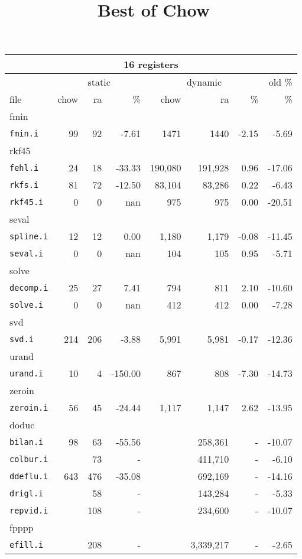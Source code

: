 \documentclass[11pt]{article}
\title{Best of Chow}
\begin{document}
\begin{tabular}{|l|r|r|r|r|r|r|r|}
\hline
\multicolumn{8}{|c|}{16 registers}\\
\hline
&\multicolumn{3}{c}{static}&\multicolumn{3}{|c|}{dynamic}&old \%\\
\hline
file&chow&ra&\%&chow&ra&\%&\%\\
\hline


%
%
\multicolumn{8}{|l|}{fmin}\\
\hline
\texttt{fmin.i}&99&92&-7.61&1471&1440&-2.15&-5.69 \\
\hline
%
%
\multicolumn{8}{|l|}{rkf45}\\
\hline
\texttt{fehl.i}&24&18&-33.33&190,080&191,928&0.96&-17.06 \\
\hline
\texttt{rkfs.i}&81&72&-12.50&83,104&83,286&0.22&-6.43 \\
\hline
\texttt{rkf45.i}&0&0&nan&975&975&0.00&-20.51 \\
\hline
%
%
\multicolumn{8}{|l|}{seval}\\
\hline
\texttt{spline.i}&12&12&0.00&1,180&1,179&-0.08&-11.45 \\
\hline
\texttt{seval.i}&0&0&nan&104&105&0.95&-5.71 \\
\hline
%
%
\multicolumn{8}{|l|}{solve}\\
\hline
\texttt{decomp.i}&25&27&7.41&794&811&2.10&-10.60 \\
\hline
\texttt{solve.i}&0&0&nan&412&412&0.00&-7.28 \\
\hline
%
%
\multicolumn{8}{|l|}{svd}\\
\hline
\texttt{svd.i}&214&206&-3.88&5,991&5,981&-0.17&-12.36 \\
\hline
%
%
\multicolumn{8}{|l|}{urand}\\
\hline
\texttt{urand.i}&10&4&-150.00&867&808&-7.30&-14.73 \\
\hline
%
%
\multicolumn{8}{|l|}{zeroin}\\
\hline
\texttt{zeroin.i}&56&45&-24.44&1,117&1,147&2.62&-13.95 \\
\hline
%
%
\multicolumn{8}{|l|}{doduc}\\
\hline
\texttt{bilan.i}&98&63&-55.56&&258,361&-&-10.07 \\
\hline
\texttt{colbur.i}&&73&-&&411,710&-&-6.10 \\
\hline
\texttt{ddeflu.i}&643&476&-35.08&&692,169&-&-14.16 \\
\hline
\texttt{drigl.i}&&58&-&&143,284&-&-5.33 \\
\hline
\texttt{repvid.i}&&108&-&&234,600&-&-10.07 \\
\hline
%
%
\multicolumn{8}{|l|}{fpppp}\\
\hline
\texttt{efill.i}&&208&-&&3,339,217&-&-2.65 \\
\hline

\end{tabular}
\end{document}
